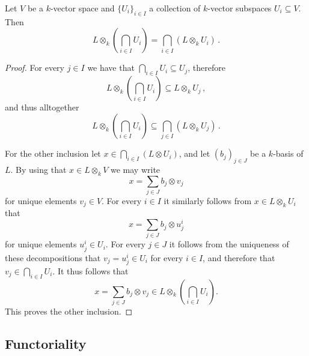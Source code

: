 \begin{corollary}
  Let $V$ be a $k$-vector space and $\{U_i\}_{i \in I}$ a collection of $k$-vector subspaces $U_i \subseteq V$.
  Then
  \[
      L \otimes_k \left( \bigcap_{i \in I} U_i \right)
    = \bigcap_{i \in I} \left( L \otimes_k U_i \right) \,.
  \]
\end{corollary}


\begin{proof}
  For every $j \in I$ we have that $\bigcap_{i \in I} U_i \subseteq U_j$, therefore
  \[
              L \otimes_k \left( \bigcap_{i \in I} U_i \right)
    \subseteq L \otimes_k U_j \,,
  \]
  and thus alltogether
  \[
              L \otimes_k \left( \bigcap_{i \in I} U_i \right)
    \subseteq \bigcap_{j \in I} (L \otimes_k U_j) \,.
  \]
  
  For the other inclusion let $x \in \bigcap_{i \in I} (L \otimes U_i)$, and let $(b_j)_{j \in J}$ be a $k$-basis of $L$.
  By using that $x \in L \otimes_k V$ we may write
  \[
      x
    = \sum_{j \in J} b_j \otimes v_j
  \]
  for unique elements $v_j \in V$.
  For every $i \in I$ it similarly follows from $x \in L \otimes_k U_i$ that
  \[
      x
    = \sum_{j \in J} b_j \otimes u^i_j
  \]
  for unique elements $u^i_j \in U_i$.
  For every $j \in J$ it follows from the uniqueness of these decompositions that $v_j = u^i_j \in U_i$ for every $i \in I$, and therefore that $v_j \in \bigcap_{i \in I} U_i$.
  It thus follows that
  \[
        x
    =   \sum_{j \in J} b_j \otimes v_j
    \in L \otimes_k \left( \bigcap_{i \in I} U_i \right).
  \]
  This proves the other inclusion.
\end{proof}





\subsection{Functoriality}

